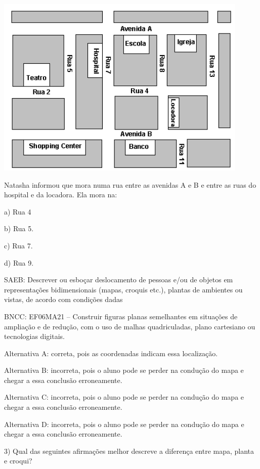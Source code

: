\includegraphics[width=4.76042in,height=3.42708in]{./imgSAEB_6_MAT/media/image75.png}

Natasha informou que mora numa rua entre as avenidas A e B e entre as
ruas do hospital e da locadora. Ela mora na:

a) Rua 4

b) Rua 5.

c) Rua 7.

d) Rua 9.

SAEB: Descrever ou esboçar deslocamento de pessoas e/ou de objetos em
representações bidimensionais (mapas, croquis etc.), plantas de
ambientes ou vistas, de acordo com condições dadas

BNCC: EF06MA21 -- Construir figuras planas semelhantes em situações de
ampliação e de redução, com o uso de malhas quadriculadas, plano
cartesiano ou tecnologias digitais.

Alternativa A: correta, pois as coordenadas indicam essa localização.

Alternativa B: incorreta, pois o aluno pode se perder na condução do
mapa e chegar a essa conclusão erroneamente.

Alternativa C: incorreta, pois o aluno pode se perder na condução do
mapa e chegar a essa conclusão erroneamente.

Alternativa D: incorreta, pois o aluno pode se perder na condução do
mapa e chegar a essa conclusão erroneamente.

3) Qual das seguintes afirmações melhor descreve a diferença entre mapa,
planta e croqui?

